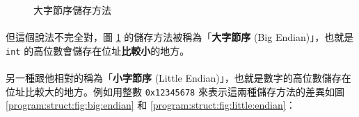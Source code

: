 \documentclass[12pt,a4paper,oneside]{article}
\begin{document}
\begin{CJK}{UTF8}{bkai}
\begin{figure}[h!]
\centering
{}
\caption{大字節序儲存方法}
\label{program:struct:fig:big:endian:16}
\end{figure}

\paragraph{}但這個說法不完全對，圖 \ref{program:struct:fig:big:endian:16} 的儲存方法被稱為「\textbf{大字節序} (Big Endian)」，也就是 \lstinline!int! 的高位數會儲存在位址\textbf{比較小}的地方。
\paragraph{}另一種跟他相對的稱為「\textbf{小字節序} (Little Endian)」，也就是數字的高位數儲存在位址比較大的地方。例如用整數 \texttt{0x12345678} 來表示這兩種儲存方法的差異如圖 \ref{program:struct:fig:big:endian} 和 \ref{program:struct:fig:little:endian}：


\end{CJK}
\end{document}
